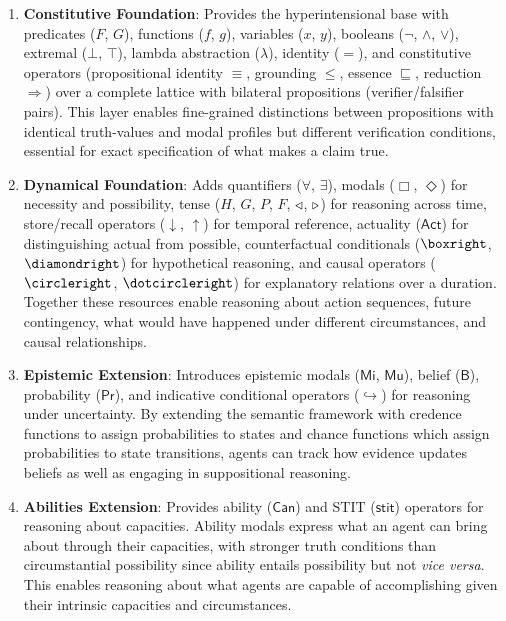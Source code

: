 \documentclass[../LogosReference.tex]{subfiles}
\begin{document}
\begin{enumerate}
	\item \textbf{Constitutive Foundation}:
	      Provides the hyperintensional base with predicates ($F$, $G$), functions ($f$, $g$), variables ($x$, $y$), booleans ($\neg$, $\land$, $\lor$), extremal ($\bot$, $\top$), lambda abstraction ($\lambda$), identity ($=$), and constitutive operators (propositional identity $\equiv$, grounding $\leq$, essence $\sqsubseteq$, reduction $\Rightarrow$) over a complete lattice with bilateral propositions (verifier/falsifier pairs).
	      This layer enables fine-grained distinctions between propositions with identical truth-values and modal profiles but different verification conditions, essential for exact specification of what makes a claim true.

	\item \textbf{Dynamical Foundation}:
	      Adds quantifiers ($\forall$, $\exists$), modals ($\Box$, $\Diamond$) for necessity and possibility, tense ($H$, $G$, $P$, $F$, $\triangleleft$, $\triangleright$) for reasoning across time, store/recall operators ($\downarrow$, $\uparrow$) for temporal reference, actuality ($\mathsf{Act}$) for distinguishing actual from possible, counterfactual conditionals ($\boxright$, $\diamondright$) for hypothetical reasoning, and causal operators ($\circleright$, $\dotcircleright$) for explanatory relations over a duration.
	      Together these resources enable reasoning about action sequences, future contingency, what would have happened under different circumstances, and causal relationships.

	\item \textbf{Epistemic Extension}:
	      Introduces epistemic modals ($\mathsf{Mi}$, $\mathsf{Mu}$), belief ($\mathsf{B}$), probability ($\mathsf{Pr}$), and indicative conditional operators ($\hookrightarrow$) for reasoning under uncertainty.
	      By extending the semantic framework with credence functions to assign probabilities to states and chance functions which assign probabilities to state transitions, agents can track how evidence updates beliefs as well as engaging in suppositional reasoning.

	\item \textbf{Abilities Extension}:
	      Provides ability ($\mathsf{Can}$) and STIT ($\mathsf{stit}$) operators for reasoning about capacities.
	      Ability modals express what an agent can bring about through their capacities, with stronger truth conditions than circumstantial possibility since ability entails possibility but not \textit{vice versa}.
	      This enables reasoning about what agents are capable of accomplishing given their intrinsic capacities and circumstances.


\end{enumerate}
\end{document}
